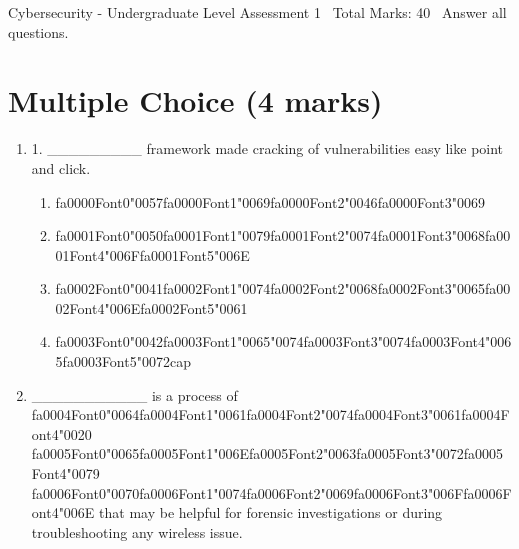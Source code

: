 \documentclass[12pt]{article}
\begin{document}
\begin{center}
Cybersecurity - Undergraduate Level Assessment 1 \
Total Marks: 40 \
Answer all questions.
\end{center}

\section*{Multiple Choice (4 marks)}
\begin{enumerate}[label=\arabic*.]
\item 1. \_\_\_\_\_\_\_\_\_ framework made cracking of vulnerabilities easy like point and click.
\begin{enumerate}[label=(\alph*)]
    \item {\csname fa0000Font0\endcsname\char"0057}{\csname fa0000Font1\endcsname\char"0069}{\csname fa0000Font2\endcsname\char"0046}{\csname fa0000Font3\endcsname\char"0069}
    \item {\csname fa0001Font0\endcsname\char"0050}{\csname fa0001Font1\endcsname\char"0079}{\csname fa0001Font2\endcsname\char"0074}{\csname fa0001Font3\endcsname\char"0068}{\csname fa0001Font4\endcsname\char"006F}{\csname fa0001Font5\endcsname\char"006E}
    \item {\csname fa0002Font0\endcsname\char"0041}{\csname fa0002Font1\endcsname\char"0074}{\csname fa0002Font2\endcsname\char"0068}{\csname fa0002Font3\endcsname\char"0065}{\csname fa0002Font4\endcsname\char"006E}{\csname fa0002Font5\endcsname\char"0061}
    \item {\csname fa0003Font0\endcsname\char"0042}{\csname fa0003Font1\endcsname\char"0065}{\char"0074}{\csname fa0003Font3\endcsname\char"0074}{\csname fa0003Font4\endcsname\char"0065}{\csname fa0003Font5\endcsname\char"0072}cap
\end{enumerate}
\item \_\_\_\_\_\_\_\_\_\_\_ is a process of {\csname fa0004Font0\endcsname\char"0064}{\csname fa0004Font1\endcsname\char"0061}{\csname fa0004Font2\endcsname\char"0074}{\csname fa0004Font3\endcsname\char"0061}{\csname fa0004Font4\endcsname\char"0020} {\csname fa0005Font0\endcsname\char"0065}{\csname fa0005Font1\endcsname\char"006E}{\csname fa0005Font2\endcsname\char"0063}{\csname fa0005Font3\endcsname\char"0072}{\csname fa0005Font4\endcsname\char"0079} {\csname fa0006Font0\endcsname\char"0070}{\csname fa0006Font1\endcsname\char"0074}{\csname fa0006Font2\endcsname\char"0069}{\csname fa0006Font3\endcsname\char"006F}{\csname fa0006Font4\endcsname\char"006E} that may be helpful for forensic investigations or during troubleshooting any wireless issue.

\end{enumerate}
\end{document}
